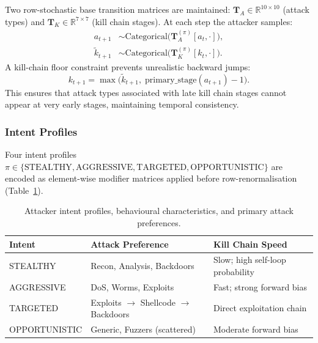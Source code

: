 Two row-stochastic base transition matrices are maintained:
$\mathbf{T}_A \in \mathbb{R}^{10 \times 10}$ (attack types) and
$\mathbf{T}_K \in \mathbb{R}^{7 \times 7}$ (kill chain stages).
At each step the attacker samples:
%
\begin{align}
  a_{t+1} &\sim \text{Categorical}\bigl(\mathbf{T}_A^{(\pi)}[a_t, \cdot]\bigr), \\
  \tilde{k}_{t+1} &\sim \text{Categorical}\bigl(\mathbf{T}_K^{(\pi)}[k_t, \cdot]\bigr).
\end{align}
%
A kill-chain floor constraint prevents unrealistic backward jumps:
%
\begin{equation}
  k_{t+1} = \max\!\bigl(\tilde{k}_{t+1},\;
                          \text{primary\_stage}(a_{t+1}) - 1\bigr).
  \label{eq:floor}
\end{equation}
%
This ensures that attack types associated with late kill chain stages cannot
appear at very early stages, maintaining temporal consistency.

\subsubsection{Intent Profiles}
\label{sec:intents}

Four intent profiles $\pi \in \{\text{STEALTHY}, \text{AGGRESSIVE},
\text{TARGETED}, \text{OPPORTUNISTIC}\}$ are encoded as element-wise
modifier matrices applied before row-renormalisation
(Table~\ref{tab:intents_meth}).

\begin{table}[ht]
  \centering
  \caption{Attacker intent profiles, behavioural characteristics, and
           primary attack preferences.}
  \label{tab:intents_meth}
  \begin{tabular}{lll}
    \toprule
    Intent & Attack Preference & Kill Chain Speed \\
    \midrule
    STEALTHY      & Recon, Analysis, Backdoors    & Slow; high self-loop probability \\
    AGGRESSIVE    & DoS, Worms, Exploits          & Fast; strong forward bias \\
    TARGETED      & Exploits $\to$ Shellcode $\to$ Backdoors & Direct exploitation chain \\
    OPPORTUNISTIC & Generic, Fuzzers (scattered)  & Moderate forward bias \\
    \bottomrule
  \end{tabular}
\end{table}

